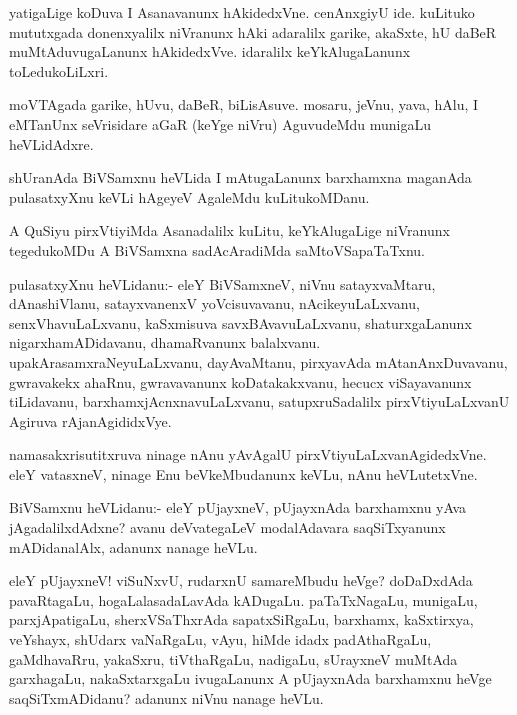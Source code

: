 \documentclass{article}
\begin{document}
\begin{mn}%
yatigaLige koDuva I Asanavanunx hAkidedxVne. cenAnxgiyU ide. kuLituko
mututxgada donenxyalilx niVranunx hAki adaralilx garike, akaSxte, hU
daBeR muMtAduvugaLanunx hAkidedxVve. idaralilx keYkAlugaLanunx toLedukoLiLxri.
\end{mn}

\begin{mn}
moVTAgada garike, hUvu, daBeR, biLisAsuve. mosaru, jeVnu, yava, hAlu,
I eMTanUnx seVrisidare aGaR (keYge niVru) AguvudeMdu munigaLu heVLidAdxre.
\end{mn}

\begin{mn}
shUranAda BiVSamxnu heVLida I mAtugaLanunx barxhamxna maganAda
pulasatxyXnu keVLi hAgeyeV AgaleMdu kuLitukoMDanu.
\end{mn}

\begin{mn}
A QuSiyu pirxVtiyiMda Asanadalilx kuLitu, keYkAlugaLige niVranunx
tegedukoMDu A BiVSamxna sadAcAradiMda saMtoVSapaTaTxnu.
\end{mn}

\begin{mn}%
pulasatxyXnu heVLidanu:- eleY BiVSamxneV, niVnu satayxvaMtaru,
dAnashiVlanu, satayxvanenxV yoVcisuvavanu, nAcikeyuLaLxvanu,
senxVhavuLaLxvanu, kaSxmisuva savxBAvavuLaLxvanu, shaturxgaLanunx
nigarxhamADidavanu, dhamaRvanunx
balalxvanu. upakArasamxraNeyuLaLxvanu, dayAvaMtanu, pirxyavAda
mAtanAnxDuvavanu, gwravakekx ahaRnu, gwravavanunx koDatakakxvanu,
hecucx viSayavanunx tiLidavanu, barxhamxjAcnxnavuLaLxvanu,
satupxruSadalilx pirxVtiyuLaLxvanU Agiruva rAjanAgididxVye.
\end{mn}

\begin{mn}
namasakxrisutitxruva ninage nAnu yAvAgalU
pirxVtiyuLaLxvanAgidedxVne. eleY vatasxneV, ninage Enu beVkeMbudanunx
keVLu, nAnu heVLutetxVne.
\end{mn}

\begin{mn}
BiVSamxnu heVLidanu:- eleY pUjayxneV, pUjayxnAda barxhamxnu yAva
jAgadalilxdAdxne? avanu deVvategaLeV modalAdavara saqSiTxyanunx
mADidanalAlx, adanunx nanage heVLu.
\end{mn}

\begin{mn}%
eleY pUjayxneV! viSuNxvU, rudarxnU samareMbudu heVge? doDaDxdAda
pavaRtagaLu, hogaLalasadaLavAda kADugaLu. paTaTxNagaLu, munigaLu,
parxjApatigaLu, sherxVSaThxrAda sapatxSiRgaLu, barxhamx, kaSxtirxya,
veYshayx, shUdarx vaNaRgaLu, vAyu, hiMde idadx padAthaRgaLu,
gaMdhavaRru, yakaSxru, tiVthaRgaLu, nadigaLu, sUrayxneV muMtAda
garxhagaLu, nakaSxtarxgaLu ivugaLanunx A pUjayxnAda barxhamxnu heVge
saqSiTxmADidanu? adanunx niVnu nanage heVLu.
\end{mn}
\end{document}
